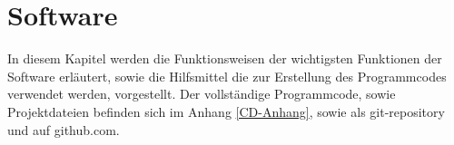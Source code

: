 \newpage
\section{Software}
In diesem Kapitel werden die Funktionsweisen der wichtigsten Funktionen der Software erläutert, sowie die Hilfsmittel die zur Erstellung des Programmcodes verwendet werden, vorgestellt. Der vollständige Programmcode, sowie Projektdateien befinden sich im Anhang \ref{CD-Anhang}, sowie als git-repository \cite{git_bpa_code} und \cite{git_lcd} auf github.com.











